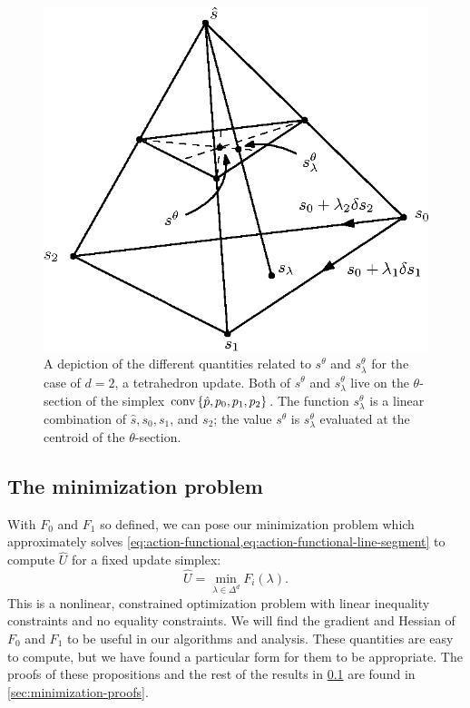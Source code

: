 \documentclass[sisc-eikonal.tex]{subfiles}
\begin{document}
\begin{figure}[t]
  \centering
  \includegraphics{slowness-tetra.eps}
  \caption{A depiction of the different quantities related to
    $s^{\theta}$ and $s^{\theta}_\lambda$ for the case of $d = 2$, a
    tetrahedron update. Both of $s^\theta$ and $s^\theta_\lambda$ live
    on the $\theta$-section of the simplex
    $\operatorname{conv} \left\{\hat{p}, p_0, p_1, p_2\right\}$. The function
    $s^\theta_\lambda$ is a linear combination of $\hat{s}, s_0, s_1$,
    and $s_2$; the value $s^\theta$ is $s^\theta_\lambda$ evaluated at
    the centroid of the $\theta$-section.}\label{fig:slowness-tetra}
\end{figure}

\subsection{The minimization problem}\label{ssec:minimization-problem}

With $F_0$ and $F_1$ so defined, we can pose our minimization problem
which approximately solves
\cref{eq:action-functional,eq:action-functional-line-segment} to
compute $\hat{U}$ for a fixed update simplex:
\begin{equation}
  \label{eq:constrained-minimization}
  \hat{U} = \min_{\lambda \in \Delta^d} F_i(\lambda).
\end{equation}
This is a nonlinear, constrained optimization problem with linear
inequality constraints and no equality constraints. We will find the
gradient and Hessian of $F_0$ and $F_1$ to be useful in our algorithms
and analysis. These quantities are easy to compute, but we have found
a particular form for them to be appropriate. The proofs of these
propositions and the rest of the results in
\cref{ssec:minimization-problem} are found in
\cref{sec:minimization-proofs}.
\end{document}
